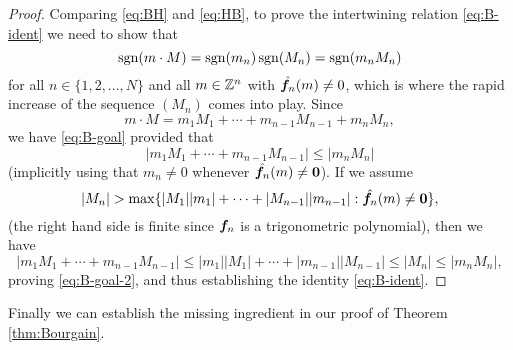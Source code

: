 \begin{proof}
  Comparing \eqref{eq:BH} and \eqref{eq:HB}, to prove the intertwining relation \eqref{eq:B-ident} we need to show that
  \begin{equation}\label{eq:B-goal}
    \operatorname{sgn}(m \cdot M) = \operatorname{sgn}(m_n)\operatorname{sgn}(M_n) = \operatorname{sgn}(m_n M_n)
  \end{equation}
  for all $n \in \{1,2,\ldots,N\}$ and all $m \in \mathbb{Z}^{n}$ with $\hat{\bm{f}_{n}}(m) \neq 0$, which is where the rapid increase of the sequence $(M_n)$ comes into play.
  Since
  \begin{equation*}
     m \cdot M = m_1 M_1 + \cdots + m_{n-1} M_{n-1} + m_n M_n,
  \end{equation*}
  we have \eqref{eq:B-goal}
  provided that
  \begin{equation}\label{eq:B-goal-2}
    | m_1 M_1 + \cdots + m_{n-1} M_{n-1} | \leq |m_n M_n|
  \end{equation}
  (implicitly using that $m_{n} \neq 0$ whenever $\hat{\bm{f}_n}(m) \neq \bm{0}$).
  If we assume
  \begin{equation*}
    |M_n| > \max \{ |M_1| |m_1| + \cdots + |M_{n-1}| |m_{n-1}| : \hat{\bm{f}_{n}}(m) \neq \bm{0}\},
  \end{equation*}
  (the right hand side is finite since $\bm{f}_n$ is a trigonometric polynomial), 
  then we have
  \begin{equation*}
    | m_1 M_1 + \cdots + m_{n-1} M_{n-1} | \leq |m_1| |M_1| + \cdots + |m_{n-1}| |M_{n-1}| \leq |M_n| \leq |m_n M_n|,
  \end{equation*}
  proving \eqref{eq:B-goal-2}, and thus establishing the identity \eqref{eq:B-ident}.
\end{proof}

Finally we can establish the missing ingredient in our proof of Theorem \ref{thm:Bourgain}.

